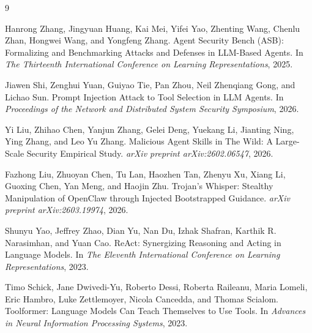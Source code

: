 \documentclass{article}
\begin{document}
{\begin{thebibliography}{9}

Hanrong Zhang, Jingyuan Huang, Kai Mei, Yifei Yao, Zhenting Wang, Chenlu Zhan, Hongwei Wang, and Yongfeng Zhang.
\newblock Agent Security Bench (ASB): Formalizing and Benchmarking Attacks and Defenses in LLM-Based Agents.
\newblock In \emph{The Thirteenth International Conference on Learning Representations}, 2025.


Jiawen Shi, Zenghui Yuan, Guiyao Tie, Pan Zhou, Neil Zhenqiang Gong, and Lichao Sun.
\newblock Prompt Injection Attack to Tool Selection in LLM Agents.
\newblock In \emph{Proceedings of the Network and Distributed System Security Symposium}, 2026.

Yi Liu, Zhihao Chen, Yanjun Zhang, Gelei Deng, Yuekang Li, Jianting Ning, Ying Zhang, and Leo Yu Zhang.
\newblock Malicious Agent Skills in The Wild: A Large-Scale Security Empirical Study.
\newblock \emph{arXiv preprint arXiv:2602.06547}, 2026.

Fazhong Liu, Zhuoyan Chen, Tu Lan, Haozhen Tan, Zhenyu Xu, Xiang Li, Guoxing Chen, Yan Meng, and Haojin Zhu.
\newblock Trojan's Whisper: Stealthy Manipulation of OpenClaw through Injected Bootstrapped Guidance.
\newblock \emph{arXiv preprint arXiv:2603.19974}, 2026.

Shunyu Yao, Jeffrey Zhao, Dian Yu, Nan Du, Izhak Shafran, Karthik R. Narasimhan, and Yuan Cao.
\newblock ReAct: Synergizing Reasoning and Acting in Language Models.
\newblock In \emph{The Eleventh International Conference on Learning Representations}, 2023.

Timo Schick, Jane Dwivedi-Yu, Roberto Dessi, Roberta Raileanu, Maria Lomeli, Eric Hambro, Luke Zettlemoyer, Nicola Cancedda, and Thomas Scialom.
\newblock Toolformer: Language Models Can Teach Themselves to Use Tools.
\newblock In \emph{Advances in Neural Information Processing Systems}, 2023.


\end{thebibliography}}
\end{document}
